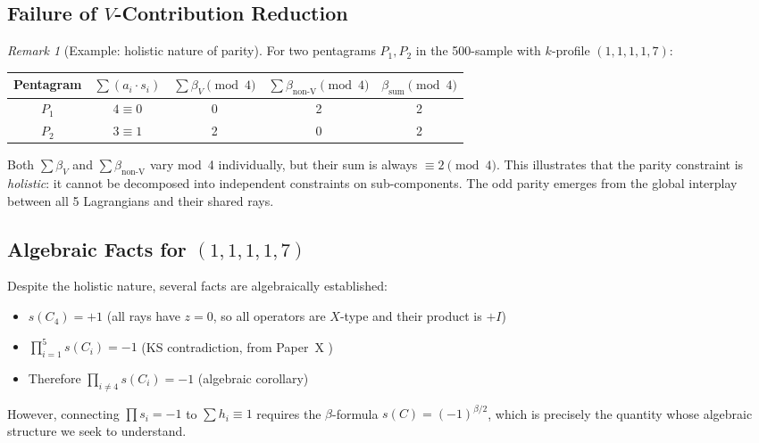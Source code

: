\documentclass[11pt,a4paper]{article}
\theoremstyle{remark}
\newtheorem{remark}[theorem]{Remark}
\begin{document}
\subsection{\texorpdfstring{Failure of $V$-Contribution Reduction}{Failure of V-Contribution Reduction}}

\begin{remark}[Example: holistic nature of parity]\label{rem:v-contrib-example}
For two pentagrams $P_1, P_2$ in the 500-sample with $k$-profile $(1,1,1,1,7)$:
\begin{center}
\begin{tabular}{ccccc}
\toprule
Pentagram & $\sum(a_i \cdot s_i)$ & $\sum \beta_V \pmod{4}$ & $\sum \beta_{\mathrm{non\text{-}V}} \pmod{4}$ & $\beta_{\mathrm{sum}} \pmod{4}$ \\
\midrule
$P_1$ & $4 \equiv 0$ & 0 & 2 & 2 \\
$P_2$ & $3 \equiv 1$ & 2 & 0 & 2 \\
\bottomrule
\end{tabular}
\end{center}
Both $\sum \beta_V$ and $\sum \beta_{\mathrm{non\text{-}V}}$ vary mod~4 individually, but their sum is
always $\equiv 2 \pmod{4}$. This illustrates that the parity constraint is
\emph{holistic}: it cannot be decomposed into independent constraints on
sub-components. The odd parity emerges from the global interplay between
all 5 Lagrangians and their shared rays.
\end{remark}

\subsection{\texorpdfstring{Algebraic Facts for $(1,1,1,1,7)$}{Algebraic Facts for (1,1,1,1,7)}}

Despite the holistic nature, several facts are algebraically established:
\begin{itemize}
  \item $s(C_4) = +1$ (all rays have $z=0$, so all operators are $X$-type and their product is $+I$)
  \item $\prod_{i=1}^5 s(C_i) = -1$ (KS contradiction, from Paper~X \cite{PaperX})
  \item Therefore $\prod_{i \neq 4} s(C_i) = -1$ (algebraic corollary)
\end{itemize}

However, connecting $\prod s_i = -1$ to $\sum h_i \equiv 1$ requires the $\beta$-formula $s(C) = (-1)^{\beta/2}$, which is precisely the quantity whose algebraic structure we seek to understand.
\end{document}
